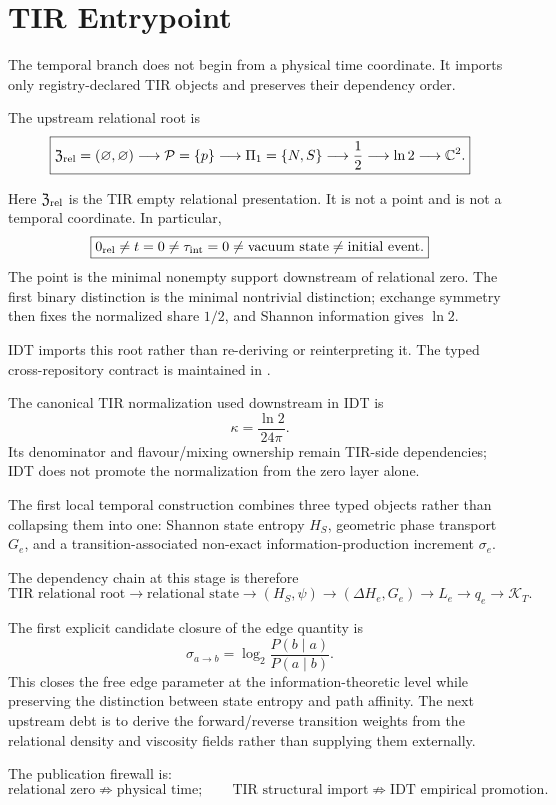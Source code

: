 \chapter{TIR Entrypoint}

The temporal branch does not begin from a physical time coordinate. It imports only registry-declared TIR objects and preserves their dependency order.

The upstream relational root is
\[
\boxed{
\mathfrak Z_{\rm rel}
=
(\varnothing,\varnothing)
\longrightarrow
\mathcal P=\{p\}
\longrightarrow
\Pi_1=\{N,S\}
\longrightarrow
\frac12
\longrightarrow
\ln2
\longrightarrow
\mathbb C^2.
}
\]

Here $\mathfrak Z_{\rm rel}$ is the TIR empty relational presentation. It is not a point and is not a temporal coordinate. In particular,
\[
\boxed{
0_{\rm rel}
\neq
t=0
\neq
\tau_{\rm int}=0
\neq
\text{vacuum state}
\neq
\text{initial event}.
}
\]
The point is the minimal nonempty support downstream of relational zero. The first binary distinction is the minimal nontrivial distinction; exchange symmetry then fixes the normalized share $1/2$, and Shannon information gives $\ln2$.

IDT imports this root rather than re-deriving or reinterpreting it. The typed cross-repository contract is maintained in
.

The canonical TIR normalization used downstream in IDT is
\[
\kappa=\frac{\ln2}{24\pi}.
\]
Its denominator and flavour/mixing ownership remain TIR-side dependencies; IDT does not promote the normalization from the zero layer alone.

The first local temporal construction combines three typed objects rather than collapsing them into one: Shannon state entropy $H_S$, geometric phase transport $G_e$, and a transition-associated non-exact information-production increment $\sigma_e$.

The dependency chain at this stage is therefore
\[
\boxed{
\text{TIR relational root}
\longrightarrow
\text{relational state}
\longrightarrow
(H_S,\psi)
\longrightarrow
(\Delta H_e,G_e)
\longrightarrow
L_e
\longrightarrow
q_e
\longrightarrow
\mathcal K_T.
}
\]

The first explicit candidate closure of the edge quantity is
\[
\sigma_{a\to b}=\log_2\frac{P(b\mid a)}{P(a\mid b)}.
\]
This closes the free edge parameter at the information-theoretic level while preserving the distinction between state entropy and path affinity. The next upstream debt is to derive the forward/reverse transition weights from the relational density and viscosity fields rather than supplying them externally.

The publication firewall is:
\[
\boxed{
\text{relational zero}
\not\Rightarrow
\text{physical time};
\qquad
\text{TIR structural import}
\not\Rightarrow
\text{IDT empirical promotion}.
}
\]
